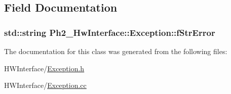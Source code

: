 \subsection{Field Documentation}
\hypertarget{class_ph2___hw_interface_1_1_exception_aa060af06e0614e117e2902f41e57e179}{
\subsubsection[{f\-Str\-Error}]{\setlength{\rightskip}{0pt plus 5cm}std\-::string Ph2\-\_\-\-Hw\-Interface\-::\-Exception\-::f\-Str\-Error\hspace{0.3cm}{\ttfamily [private]}}}\label{class_ph2___hw_interface_1_1_exception_aa060af06e0614e117e2902f41e57e179}


The documentation for this class was generated from the following files\-:\begin{DoxyCompactItemize}
\item 
H\-W\-Interface/\hyperlink{_exception_8h}{Exception.\-h}\item 
H\-W\-Interface/\hyperlink{_exception_8cc}{Exception.\-cc}\end{DoxyCompactItemize}
